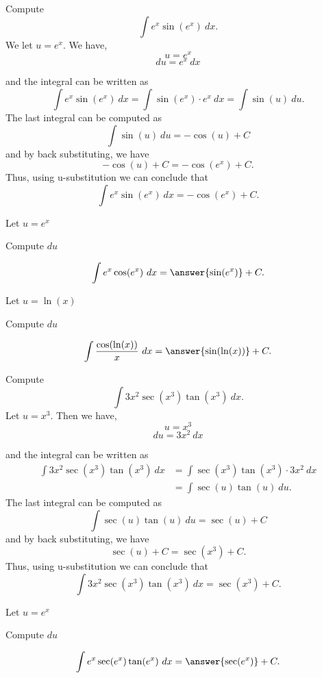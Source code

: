 \documentclass{ximera}
\begin{document}
\begin{example} Compute 
\[\int e^x\sin(e^x) \ dx.\]
We let $u = e^x$.  We have,
\[u = e^x\]
\[du = e^x \ dx\]

and the integral can be written as 
\[\int e^x\sin(e^x) \ dx = \int \sin(e^x) \cdot e^x \  dx = \int \sin(u) \ du.\]
The last integral can be computed as 
\[\int \sin(u) \ du = -\cos(u) + C\]
and by back substituting, we have 
\[-\cos(u) + C = -\cos(e^x) + C.\]
Thus, using u-substitution we can conclude that
\[\int e^x\sin(e^x) \ dx =  -\cos(e^x) + C.\]
\end{example}


\begin{problem}
\begin{hint}
Let $u = e^x$
\end{hint}
\begin{hint}
Compute $du$
\end{hint}
\[\int e^x\cos(e^x) \ dx = \answer{\sin(e^x)} +C.\]
\end{problem}

\begin{problem}
\begin{hint}
Let $u = \ln(x)$
\end{hint}
\begin{hint}
Compute $du$
\end{hint}
\[\int \frac{\cos(\ln(x))}{x} \ dx = \answer{\sin(\ln(x))} +C.\]
\end{problem}


\begin{example} Compute 
\[\int 3x^2\sec(x^3)\tan(x^3) \ dx.\]
Let $u = x^3$.  Then we have,
\[u = x^3\]
\[du = 3x^2 \ dx\]

and the integral can be written as 
\begin{align*}
\int 3x^2\sec(x^3)\tan(x^3) \ dx &= \int \sec(x^3)\tan(x^3) \cdot 3x^2 \ dx\\
&= \int \sec(u)\tan(u) \ du.
\end{align*}
The last integral can be computed as 
\[\int \sec(u)\tan(u) \ du = \sec(u) + C\]
and by back substituting, we have 
\[\sec(u) + C = \sec(x^3) + C.\]
Thus, using u-substitution we can conclude that
\[\int 3x^2\sec(x^3)\tan(x^3) \ dx =  \sec(x^3) + C.\]
\end{example}

\begin{problem}
\begin{hint}
Let $u = e^x$
\end{hint}
\begin{hint}
Compute $du$
\end{hint}
\[\int e^x\sec(e^x)\tan(e^x) \ dx = \answer{\sec(e^x)} +C.\]
\end{problem}
\end{document}
